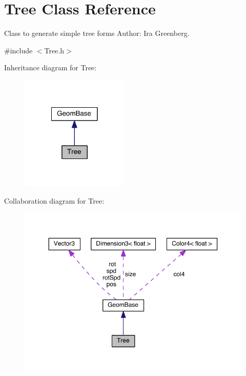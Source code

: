 \hypertarget{class_tree}{\section{Tree Class Reference}
\label{class_tree}
}


Class to generate simple tree forms Author\-: Ira Greenberg.  




{\ttfamily \#include $<$Tree.\-h$>$}



Inheritance diagram for Tree\-:
\nopagebreak
\begin{figure}[H]
\begin{center}
\leavevmode
\includegraphics[width=146pt]{class_tree__inherit__graph}
\end{center}
\end{figure}


Collaboration diagram for Tree\-:
\nopagebreak
\begin{figure}[H]
\begin{center}
\leavevmode
\includegraphics[width=350pt]{class_tree__coll__graph}
\end{center}
\end{figure}

